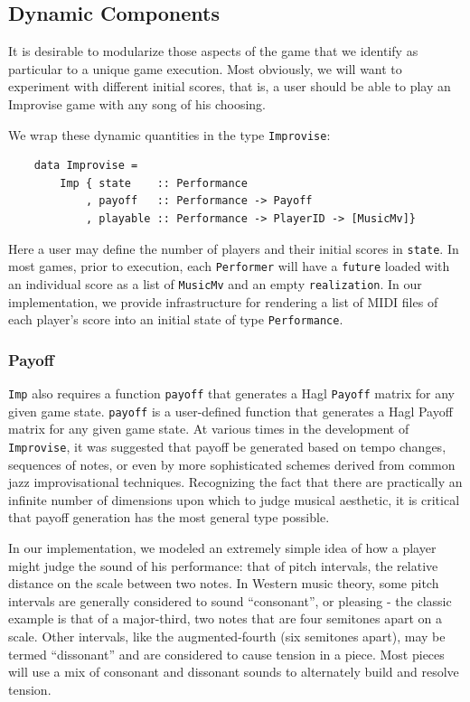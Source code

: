 \documentclass{article}
\begin{document}
\subsection{Dynamic Components}

It is desirable to modularize those aspects of the game that we identify
as particular to a unique game execution. Most obviously, we will want
to experiment with different initial scores, that is, a user should be
able to play an Improvise game with any song of his choosing.

We wrap these dynamic quantities in the type \texttt{Improvise}:

\begin{verbatim}
    data Improvise = 
        Imp { state    :: Performance
            , payoff   :: Performance -> Payoff
            , playable :: Performance -> PlayerID -> [MusicMv]}
\end{verbatim}

Here a user may define the number of players and their initial scores in
\texttt{state}. In most games, prior to execution, each
\texttt{Performer} will have a \texttt{future} loaded with an individual
score as a list of \texttt{MusicMv} and an empty \texttt{realization}.
In our implementation, we provide infrastructure for rendering a list of
MIDI files of each player's score into an initial state of type
\texttt{Performance}.

\subsubsection{Payoff}
\texttt{Imp} also requires a function \texttt{payoff} that generates a 
Hagl \texttt{Payoff} matrix for any given game state.
\texttt{payoff} is a user-defined function that generates a Hagl Payoff
matrix for any given game state. At various times in the development of
\texttt{Improvise}, it was suggested that payoff be generated based on tempo
changes, sequences of notes, or even by more sophisticated schemes
derived from common jazz improvisational techniques. Recognizing the
fact that there are practically an infinite number of dimensions upon which to
judge musical aesthetic, it is critical that payoff generation has the
most general type possible.

In our implementation, we modeled an extremely simple idea of how a
player might judge the sound of his performance: that of pitch
intervals, the relative distance on the scale between two notes. In
Western music theory, some pitch intervals are generally considered to
sound ``consonant'', or pleasing - the classic example is that of a
major-third, two notes that are four semitones apart on a scale. Other
intervals, like the augmented-fourth (six semitones apart), may be
termed ``dissonant'' and are considered to cause tension in a piece.
Most pieces will use a mix of consonant and dissonant sounds to
alternately build and resolve tension.
\end{document}

